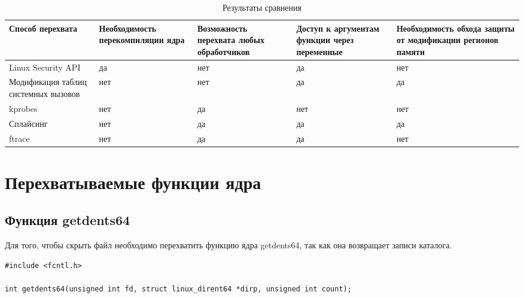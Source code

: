 \begin{table}[h]
	\begin{center}
		\begin{threeparttable}
			\captionsetup{justification=raggedright,singlelinecheck=off}
			\caption{\label{tbl:compare} Результаты сравнения}
			\begin{tabular}{|p{2.9cm}|p{3cm}|p{3cm}|p{3cm}|p{3.2cm}|}
				\hline
				Способ перехвата & Необходимость перекомпиляции ядра & Возможность перехвата любых обработчиков & Доступ к аргументам функции через переменные & Необходимость обхода защиты от модификации регионов памяти\\  \hline
				Linux Security API & да & нет & да &  нет \\ \hline 
				Модификация таблиц системных вызовов & нет & нет & да  & да \\ \hline 
				kprobes & нет & да & нет & нет  \\ \hline 
				Сплайсинг & нет & да& да &  да \\ \hline 
				ftrace & нет & да & да & нет \\ \hline 
			\end{tabular}
		\end{threeparttable}
	\end{center}
\end{table}


\section{Перехватываемые функции ядра}




\subsection{Функция getdents64}

Для того, чтобы скрыть файл необходимо перехватить функцию ядра getdents64, так как она возвращает записи каталога. 
\begin{lstlisting}[label=code:getdents64,caption=Функции getdents64]
#include <fcntl.h>
	
int getdents64(unsigned int fd, struct linux_dirent64 *dirp, unsigned int count);
\end{lstlisting}

